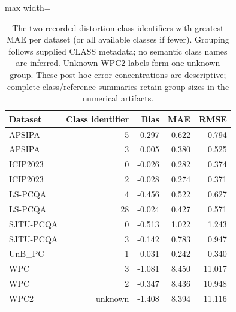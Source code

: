 \begin{table}[t!]
\centering
\caption{The two recorded distortion-class identifiers with greatest MAE per dataset (or all available classes if fewer). Grouping follows supplied CLASS metadata; no semantic class names are inferred. Unknown WPC2 labels form one unknown group. These post-hoc error concentrations are descriptive; complete class/reference summaries retain group sizes in the numerical artifacts.}
\label{tab_review_error_groups}
\scriptsize
\begin{adjustbox}{max width=\textwidth}
\begin{tabular}{lrrrr}
\toprule
Dataset & Class identifier & Bias & MAE & RMSE \\
\midrule
APSIPA & 5 & -0.297 & 0.622 & 0.794 \\
APSIPA & 3 & 0.005 & 0.380 & 0.525 \\
ICIP2023 & 0 & -0.026 & 0.282 & 0.374 \\
ICIP2023 & 2 & -0.028 & 0.274 & 0.371 \\
LS-PCQA & 4 & -0.456 & 0.522 & 0.627 \\
LS-PCQA & 28 & -0.024 & 0.427 & 0.571 \\
SJTU-PCQA & 0 & -0.513 & 1.022 & 1.243 \\
SJTU-PCQA & 3 & -0.142 & 0.783 & 0.947 \\
UnB\_PC & 1 & 0.031 & 0.242 & 0.340 \\
WPC & 3 & -1.081 & 8.450 & 11.017 \\
WPC & 2 & -0.347 & 8.436 & 10.948 \\
WPC2 & unknown & -1.408 & 8.394 & 11.116 \\
\bottomrule
\end{tabular}
\end{adjustbox}
\end{table}
